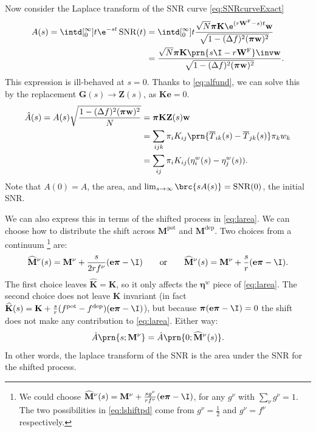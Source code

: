 \documentclass[12pt]{article}
\newcommand{\onev}{\mathbf{e}}
\newcommand{\eqm}{\pi}
\newcommand{\eq}{\boldsymbol{\eqm}}
\newcommand{\fptm}{T}
\newcommand{\fptbm}{\overline{\fptm}}
\newcommand{\fundm}{Z}
\newcommand{\fund}{\mathbf{\fundm}}
\newcommand{\etwm}{\eta^w}
\newcommand{\etw}{\boldsymbol{\eta}^w}
\newcommand{\wm}{w}
\newcommand{\w}{\mathbf{\wm}}
\newcommand{\Wm}{W}
\newcommand{\W}{\mathbf{\Wm}}
\newcommand{\MMdm}{M}
\newcommand{\MMd}{\mathbf{\MMdm}}
\newcommand{\encm}{K}
\newcommand{\enc}{\mathbf{\encm}}
\newcommand{\frg}{\W^{\mathrm{F}}}
\newcommand{\pot}{^{\text{pot}}}
\newcommand{\dep}{^{\text{dep}}}
\DeclareMathOperator{\SNR}{SNR}
\newcommand{\shift}[1]{\widehat{#1}}
\begin{document}
Now consider the Laplace transform of the SNR curve \eqref{eq:SNRcurveExact}
%
\begin{equation}\label{eq:lsnr}
\begin{aligned}
  A(s) = \intd[_0^{\infty}]{t} \e^{-st}\SNR(t) 
   &= \intd[_0^{\infty}]{t} \frac{ \sqrt{N} \eq \enc \e^{(r\frg-s)t} \w }
                                { \sqrt{1-(\Delta f)^2(\eq\w)^2} } \\
   &= \frac{\sqrt{N} \eq \enc \prn{s \I - r\frg}\inv \w }{\sqrt{1-(\Delta f)^2(\eq\w)^2}}.
\end{aligned}
\end{equation}
%
This expression is ill-behaved at \(s=0\).
Thanks to \eqref{eq:alfund}, we can solve this by the replacement \(\mathbf{G}(s) \to \fund(s)\), as \(\enc\onev=0\).
%
\begin{equation}\label{eq:larea}
\begin{aligned}
  \hat{A}(s) = A(s) \sqrt{\frac{{{1-(\Delta f)^2(\eq\w)^2}}}{N}}  &=  \eq \enc \fund(s) \w \\
    &= \sum_{ijk} \eqm_i \encm_{ij} \prn{\fptbm_{ik}(s)-\fptbm_{jk}(s)} \eqm_k \wm_k \\
    &= \sum_{ij}  \eqm_i \encm_{ij} (\etwm_{i}(s) - \etwm_{j}(s)).
\end{aligned}
\end{equation}
%
Note that \(A(0)=A\), the area, and \(\lim_{s\to\infty} \brc{sA(s)} = \SNR(0)\), the initial SNR.

We can also express this in terms of the shifted process in \cref{eq:larea}.
We can choose how to distribute the shift across \(\MMd \pot\) and \(\MMd \dep\).
Two choices from a continuum%
\footnote{We could choose \( \shift{\MMd}^\nu(s) = \MMd^\nu + \frac{s g^\nu}{r f^\nu} (\onev \eq - \I) \), for any \(g^\nu \) with \( \sum_\nu g^\nu = 1 \).
The two possibilities in \cref{eq:lshiftpd} come from \(g^\nu = \frac{1}{2}\) and \(g^\nu = f^\nu\) respectively.}
are:
%
\begin{equation}\label{eq:lshiftpd}
  \shift{\MMd}^\nu(s) = \MMd^\nu + \frac{s}{2 r f^\nu} (\onev \eq - \I)
  \qquad \text{or} \qquad
  \shift{\MMd}^\nu(s) = \MMd^\nu + \frac{s}{r} (\onev \eq - \I).
\end{equation}
%
The first choice leaves \( \shift{\enc} = \enc \), so it only affects the \(\etw\) piece of \cref{eq:larea}.
The second choice does not leave \(\enc\) invariant (in fact \( \shift{\enc}(s) = \enc + \frac{s}{r} (f\pot - f\dep) (\onev \eq - \I) \)), but because \( \eq (\onev \eq - \I) = 0 \) the shift does not make any contribution to \cref{eq:larea}.
Either way:
%
\begin{equation}\label{eq:lareashift}
  \hat{A}\prn{s; \MMd^\nu} = \hat{A}\prn{0; \shift{\MMd}^\nu(s)}.
\end{equation}
%
In other words, the laplace transform of the SNR is the area under the SNR for the shifted process.
\end{document}
